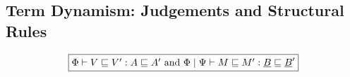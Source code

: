 \documentclass[acmsmall,nonacm]{acmart}
\renewcommand{\u}{\underline}
\newcommand{\ltdyn}{\sqsubseteq}
\begin{document}




\subsection{Term Dynamism: Judgements and Structural Rules}

\begin{figure}
  \begin{small}
  \[
  \begin{array}{c}
    \framebox{$\Phi \vdash V \ltdyn V' : A \ltdyn A'$ and $\Phi \mid \Psi \vdash M \ltdyn M' : \u B \ltdyn \u B'$}
    \\\\
    

\end{array}\]
\end{small}
\end{figure}
\end{document}
